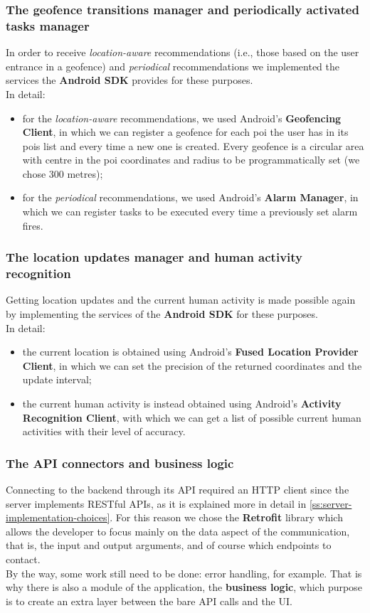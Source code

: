 \documentclass[../../main]{subfiles}
\begin{document}
\subsubsection{The geofence transitions manager and periodically activated tasks manager}
In order to receive \textit{location-aware} recommendations (i.e., those based on the user entrance in a geofence) and \textit{periodical} recommendations we implemented the services the \textbf{Android SDK} provides for these purposes.\\
In detail:
\begin{itemize}
    \item for the \textit{location-aware} recommendations, we used Android's \textbf{Geofencing Client}, in which we can register a geofence for each poi the user has in its pois list and every time a new one is created.
    Every geofence is a circular area with centre in the poi coordinates and radius to be programmatically set (we chose 300 metres);
    \item for the \textit{periodical} recommendations, we used Android's \textbf{Alarm Manager}, in which we can register tasks to be executed every time a previously set alarm fires.
\end{itemize}

\subsubsection{The location updates manager and human activity recognition}
Getting location updates and the current human activity is made possible again by implementing the services of the \textbf{Android SDK} for these purposes.\\
In detail:
\begin{itemize}
    \item the current location is obtained using Android's \textbf{Fused Location Provider Client}, in which we can set the precision of the returned coordinates and the update interval;
    \item the current human activity is instead obtained using Android's \textbf{Activity Recognition Client}, with which we can get a list of possible current human activities with their level of accuracy.
\end{itemize}

\subsubsection{The API connectors and business logic}
Connecting to the backend through its API required an HTTP client since the server implements RESTful APIs, as it is explained more in detail in \ref{ss:server-implementation-choices}.
For this reason we chose the \textbf{Retrofit} library which allows the developer to focus mainly on the data aspect of the communication, that is, the input and output arguments, and of course which endpoints to contact.\\
By the way, some work still need to be done: error handling, for example. That is why there is also a module of the application, the \textbf{business logic}, which purpose is to create an extra layer between the bare API calls and the UI.
\end{document}

